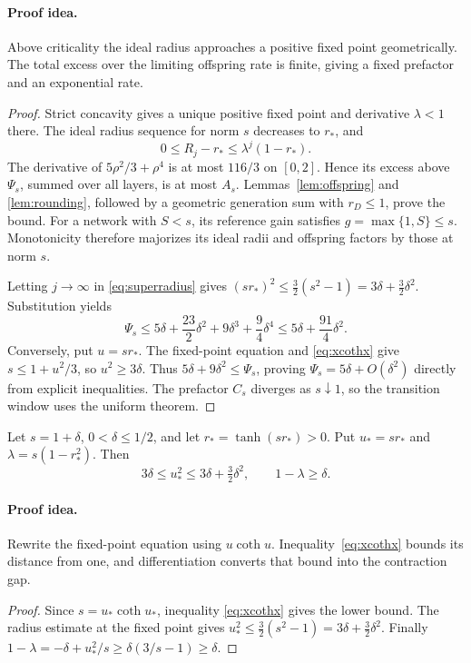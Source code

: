 \paragraph{Proof idea.}
Above criticality the ideal radius approaches a positive fixed point
geometrically. The total excess over the limiting offspring rate is finite,
giving a fixed prefactor and an exponential rate.

\begin{proof}
Strict concavity gives a unique positive fixed point and derivative
\(\lambda<1\) there.
The ideal radius sequence for norm \(s\) decreases to \(r_*\), and
\[
0\le R_j-r_*\le\lambda^j(1-r_*).
\]
The derivative of \(5\rho^2/3+\rho^4\) is at most \(116/3\)
on \([0,2]\). Hence its excess above \(\Psi_s\), summed over
all layers, is at most \(A_s\).
Lemmas~\ref{lem:offspring} and \ref{lem:rounding}, followed by a
geometric generation sum with \(r_D\le1\), prove the bound.
For a network with \(S<s\), its reference gain satisfies
\(g=\max\{1,S\}\le s\). Monotonicity therefore majorizes its
ideal radii and offspring factors by those at norm \(s\).

Letting \(j\to\infty\) in \eqref{eq:superradius} gives
\((sr_*)^2\le\frac32(s^2-1)=3\delta+\frac32\delta^2\).
Substitution yields
\[
\Psi_s\le
5\delta+\frac{23}{2}\delta^2+9\delta^3+\frac94\delta^4
\le5\delta+\frac{91}{4}\delta^2.
\]
Conversely, put \(u=sr_*\). The fixed-point equation and
\eqref{eq:xcothx} give \(s\le1+u^2/3\), so
\(u^2\ge3\delta\). Thus
\(5\delta+9\delta^2\le\Psi_s\), proving
\(\Psi_s=5\delta+O(\delta^2)\) directly from explicit inequalities.
The prefactor \(C_s\) diverges as \(s\downarrow1\), so the
transition window uses the uniform theorem.
\end{proof}


\begin{lemma}\label{lem:nearcriticalgap}
Let $s=1+\delta$, $0<\delta\le1/2$, and let $r_*=\tanh(sr_*)>0$.
Put $u_*=sr_*$ and $\lambda=s(1-r_*^2)$. Then
\[
 3\delta\le u_*^2\le3\delta+\tfrac32\delta^2,
 \qquad 1-\lambda\ge\delta.
\]
\end{lemma}
\paragraph{Proof idea.}
Rewrite the fixed-point equation using $u\coth u$.
Inequality~\eqref{eq:xcothx} bounds its distance from one, and differentiation converts that
bound into the contraction gap.

\begin{proof}
Since $s=u_*\coth u_*$, inequality \eqref{eq:xcothx} gives the
lower bound. The radius estimate at the fixed point gives
$u_*^2\le\frac32(s^2-1)=3\delta+\frac32\delta^2$.
Finally
$1-\lambda=-\delta+u_*^2/s\ge\delta(3/s-1)\ge\delta$.
\end{proof}
